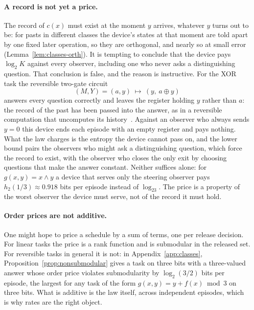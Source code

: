 \paragraph{A record is not yet a price.} The record of $c(x)$ must exist at the moment $y$ arrives, whatever $y$ turns out to be: for pasts in different classes the device's states at that moment are told apart by one fixed later operation, so they are orthogonal, and nearly so at small error (Lemma~\ref{lem:classes-orth}). It is tempting to conclude that the device pays $\log_2K$ against every observer, including one who never asks a distinguishing question. That conclusion is false, and the reason is instructive. For the XOR task the reversible two-gate circuit
\[
(M,Y)=(a,y)\ \longmapsto\ (y,\ a\oplus y)
\]
answers every question correctly and leaves the register holding $y$ rather than $a$: the record of the past has been passed into the answer, as in a reversible computation that uncomputes its history~\cite{Bennett73}. Against an observer who always sends $y=0$ this device ends each episode with an empty register and pays nothing. What the law charges is the entropy the device cannot pass on, and the lower bound pairs the observers who might ask a distinguishing question, which force the record to exist, with the observer who closes the only exit by choosing questions that make the answer constant. Neither suffices alone: for $g(x,y)=x\wedge y$ a device that serves only the steering observer pays $h_2(1/3)\approx0.918$ bits per episode instead of $\log_23$. The price is a property of the worst observer the device must serve, not of the record it must hold.

\paragraph{Order prices are not additive.} One might hope to price a schedule by a sum of terms, one per release decision. For linear tasks the price is a rank function and is submodular in the released set. For reversible tasks in general it is not: in Appendix~\ref{app:classes}, Proposition~\ref{prop:nonsubmodular} gives a task on three bits with a three-valued answer whose order price violates submodularity by $\log_2(3/2)$ bits per episode, the largest for any task of the form $g(x,y)=y+f(x)\bmod3$ on three bits. What is additive is the law itself, across independent episodes, which is why rates are the right object.
